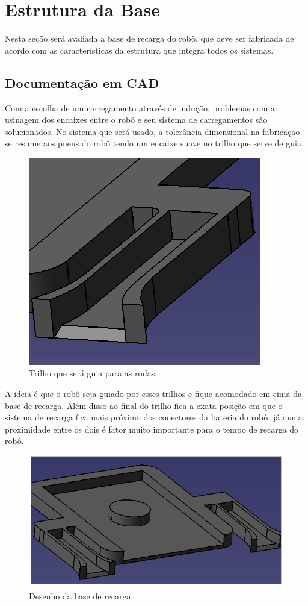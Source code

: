 \section{Estrutura da Base}

Nesta seção será avaliada a base de recarga do robô, que deve ser fabricada de acordo com as características da estrutura que integra todos os sistemas.

\subsection{Documentação em CAD}
Com a escolha de um carregamento através de indução, problemas com a usinagem dos encaixes entre o robô e seu sistema de carregamentos são solucionados. No sistema que será usado, a tolerância dimensional na fabricação se resume aos pneus do robô tendo um encaixe suave no trilho que serve de guia.

\begin{figure}[H]
	\centering
	\includegraphics[scale=0.7]{figuras/trilho_base.png}
	\caption{Trilho que será guia para as rodas.}
	\label{img:trilho_base}
\end{figure}

A ideia é que o robô seja guiado por esses trilhos e fique acomodado em cima da base de recarga. Além disso ao final do trilho fica a exata posição em que o sistema de recarga fica mais próximo dos conectores da bateria do robô, já que a proximidade entre os dois é fator muito importante para o tempo de recarga do robô.

\begin{figure}[H]
	\centering
	\includegraphics[scale=0.7]{figuras/desenho_base_recarga.png}
	\caption{Desenho da base de recarga.}
	\label{img:desenho_base_recarga}
\end{figure}
